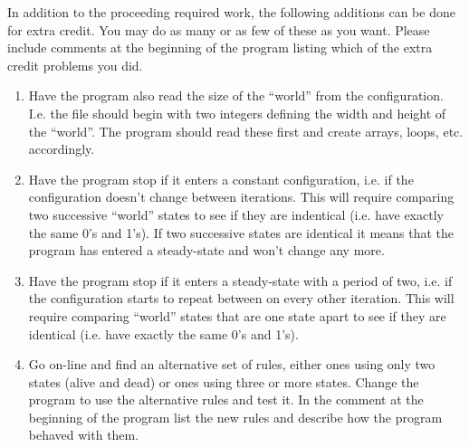 \documentclass[11pt]{article}
\begin{document}
In addition to the proceeding required work, the following additions can be done for extra credit.  You may do as many or as few of these as you want.  Please include comments at the beginning of the program listing which of the extra credit problems you did.
\begin{enumerate}
\item Have the program also read the size of the ``world'' from the configuration.  I.e. the file should begin with two integers defining the width and height of the ``world''.   The program should read these first and create arrays, loops, etc. accordingly.

\item Have the program stop if it enters a constant configuration, i.e. if the configuration doesn't change between iterations.  This will require comparing two successive ``world'' states to see if they are indentical (i.e. have exactly the same 0's and 1's).  If two successive states are identical it means that the program has entered a steady-state and won't change any more.

\item Have the program  stop if it enters a steady-state with a period of two, i.e. if the configuration starts to repeat between on every other iteration.  This will require comparing ``world'' states that are one state apart to see if they are identical (i.e. have exactly the same 0's and 1's).  

\item Go on-line and find an alternative set of rules, either ones using only two states (alive and dead) or ones using three or more states.  Change the program to use the alternative rules and test it.   In the comment at the beginning of the program list the new rules and describe how the program behaved with them.
\end{enumerate}
\end{document}
